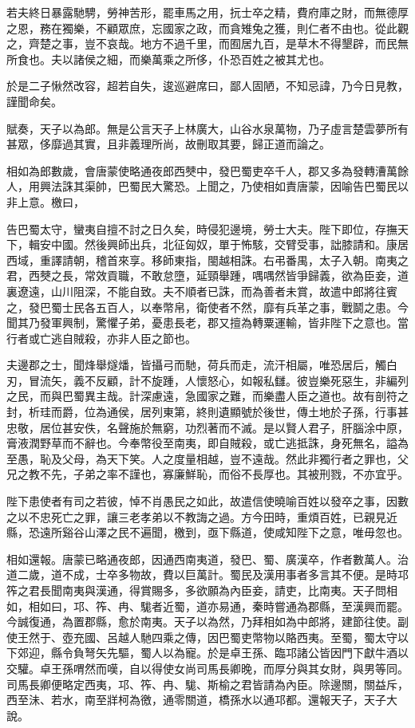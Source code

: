 若夫終日暴露馳騁，勞神苦形，罷車馬之用，抏士卒之精，費府庫之財，而無德厚之恩，務在獨樂，不顧眾庶，忘國家之政，而貪雉兔之獲，則仁者不由也。從此觀之，齊楚之事，豈不哀哉。地方不過千里，而囿居九百，是草木不得墾辟，而民無所食也。夫以諸侯之細，而樂萬乘之所侈，仆恐百姓之被其尤也。

於是二子愀然改容，超若自失，逡巡避席曰，鄙人固陋，不知忌諱，乃今日見教，謹聞命矣。

賦奏，天子以為郎。無是公言天子上林廣大，山谷水泉萬物，乃子虛言楚雲夢所有甚眾，侈靡過其實，且非義理所尚，故刪取其要，歸正道而論之。

相如為郎數歲，會唐蒙使略通夜郎西僰中，發巴蜀吏卒千人，郡又多為發轉漕萬餘人，用興法誅其渠帥，巴蜀民大驚恐。上聞之，乃使相如責唐蒙，因喻告巴蜀民以非上意。檄曰，

告巴蜀太守，蠻夷自擅不討之日久矣，時侵犯邊境，勞士大夫。陛下即位，存撫天下，輯安中國。然後興師出兵，北征匈奴，單于怖駭，交臂受事，詘膝請和。康居西域，重譯請朝，稽首來享。移師東指，閩越相誅。右弔番禺，太子入朝。南夷之君，西僰之長，常效貢職，不敢怠墮，延頸舉踵，喁喁然皆爭歸義，欲為臣妾，道裏遼遠，山川阻深，不能自致。夫不順者已誅，而為善者未賞，故遣中郎將往賓之，發巴蜀士民各五百人，以奉幣帛，衛使者不然，靡有兵革之事，戰鬬之患。今聞其乃發軍興制，驚懼子弟，憂患長老，郡又擅為轉粟運輸，皆非陛下之意也。當行者或亡逃自賊殺，亦非人臣之節也。

夫邊郡之士，聞烽舉燧燔，皆攝弓而馳，荷兵而走，流汗相屬，唯恐居后，觸白刃，冒流矢，義不反顧，計不旋踵，人懷怒心，如報私讎。彼豈樂死惡生，非編列之民，而與巴蜀異主哉。計深慮遠，急國家之難，而樂盡人臣之道也。故有剖符之封，析珪而爵，位為通侯，居列東第，終則遺顯號於後世，傳土地於子孫，行事甚忠敬，居位甚安佚，名聲施於無窮，功烈著而不滅。是以賢人君子，肝腦涂中原，膏液潤野草而不辭也。今奉幣役至南夷，即自賊殺，或亡逃抵誅，身死無名，謚為至愚，恥及父母，為天下笑。人之度量相越，豈不遠哉。然此非獨行者之罪也，父兄之教不先，子弟之率不謹也，寡廉鮮恥，而俗不長厚也。其被刑戮，不亦宜乎。

陛下患使者有司之若彼，悼不肖愚民之如此，故遣信使曉喻百姓以發卒之事，因數之以不忠死亡之罪，讓三老孝弟以不教誨之過。方今田時，重煩百姓，已親見近縣，恐遠所谿谷山澤之民不遍聞，檄到，亟下縣道，使咸知陛下之意，唯毋忽也。

相如還報。唐蒙已略通夜郎，因通西南夷道，發巴、蜀、廣漢卒，作者數萬人。治道二歲，道不成，士卒多物故，費以巨萬計。蜀民及漢用事者多言其不便。是時邛筰之君長聞南夷與漢通，得賞賜多，多欲願為內臣妾，請吏，比南夷。天子問相如，相如曰，邛、筰、冉、駹者近蜀，道亦易通，秦時嘗通為郡縣，至漢興而罷。今誠復通，為置郡縣，愈於南夷。天子以為然，乃拜相如為中郎將，建節往使。副使王然于、壺充國、呂越人馳四乘之傳，因巴蜀吏幣物以賂西夷。至蜀，蜀太守以下郊迎，縣令負弩矢先驅，蜀人以為寵。於是卓王孫、臨邛諸公皆因門下獻牛酒以交驩。卓王孫喟然而嘆，自以得使女尚司馬長卿晚，而厚分與其女財，與男等同。司馬長卿便略定西夷，邛、筰、冉、駹、斯榆之君皆請為內臣。除邊關，關益斥，西至沬、若水，南至牂柯為徼，通零關道，橋孫水以通邛都。還報天子，天子大說。


